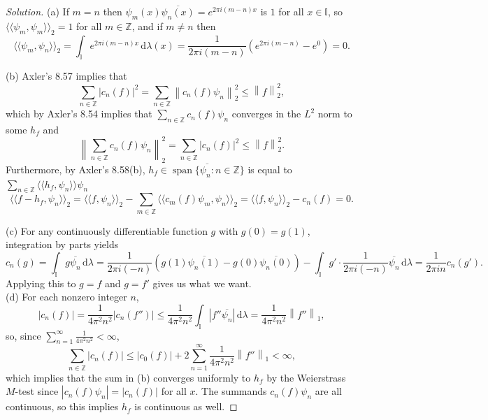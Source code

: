 \documentclass[10pt]{article}
\providecommand{\ol}{\overline}
\newcommand{\dd}{\,\mathrm{d}}
\providecommand{\II}{\mathbb I}
\providecommand{\ZZ}{\mathbb Z}
\newenvironment{soln}{\begin{proof}[Solution]}{\end{proof}}
\providecommand{\abs}[1]{\left\lvert #1\right\rvert}
\providecommand{\innerprod}[1]{\langle\!\langle #1\rangle\!\rangle}
\providecommand{\norm}[1]{\left\| #1\right\|}
\begin{document}
\begin{soln}
    (a) If $m=n$ then $\psi_m(x)\ol{\psi_n(x)} = e^{2\pi i(m-n)x}$
    is $1$ for all $x\in\II$, so $\innerprod{\psi_m,\psi_m}_2 = 1$
    for all $m\in\ZZ$, and if $m\ne n$ then
    \begin{equation*}
	\innerprod{\psi_m, \psi_n}_2 =
	\int_{\II} e^{2\pi i(m-n)x}\dd\lambda(x)
	= \frac{1}{2\pi i(m-n)}(e^{2\pi i(m-n)} - e^0) = 0.
    \end{equation*}

    (b) Axler's 8.57 implies that
    \[
	\sum_{n\in\ZZ} \abs{c_n(f)}^2 =
	\sum_{n\in\ZZ}\norm{c_n(f)\psi_n}_2^2 \le \norm{f}_2^2,
    \]
    which by Axler's 8.54 implies that $\sum_{n\in\ZZ}c_n(f)\psi_n$ converges
    in the $L^2$ norm to some $h_f$ and
    \begin{equation*}
	\norm{\sum_{n\in\ZZ} c_n(f)\psi_n}_2^2
	= \sum_{n\in\ZZ} \abs{c_n(f)}^2 \le \norm{f}_2^2.
    \end{equation*}
    Furthermore, by Axler's 8.58(b),
    $h_f\in\ol{\operatorname{span}\{\psi_n : n\in\ZZ\}}$
    is equal to $\sum_{n\in\ZZ}\innerprod{h_f,\psi_n}\psi_n$
    \begin{equation*}
	\innerprod{f-h_f,\psi_n}_2 = \innerprod{f,\psi_n}_2 -
	\sum_{m\in\ZZ}\innerprod{c_m(f)\psi_m,\psi_n}_2
	= \innerprod{f,\psi_n}_2 - c_n(f) = 0.
    \end{equation*}

    (c) For any continuously differentiable function $g$
    with $g(0) = g(1)$, integration by parts yields
    \begin{equation*}
	c_n(g) = \int_{\II} g\ol{\psi_n}\dd\lambda
	= \frac 1{2\pi i(-n)}(g(1)\ol{\psi_n(1)} - g(0)\ol{\psi_n(0)})
	- \int_{\II}g'\cdot\frac 1{2\pi i(-n)}\ol{\psi_n}\dd\lambda
	= \frac 1{2\pi in}c_n(g').
    \end{equation*}
    Applying this to $g = f$ and $g = f'$ gives us what we want.
    \\

    (d) For each nonzero integer $n$,
    \begin{equation*}
	\abs{c_n(f)} = \frac{1}{4\pi^2n^2}\abs{c_n(f'')}
	\le \frac 1{4\pi^2n^2}\int_{\II}\abs{f''\ol{\psi_n}}\dd\lambda
	= \frac 1{4\pi^2n^2}\norm{f''}_1,
    \end{equation*}
    so, since $\sum_{n=1}^\infty \frac1{4\pi^2n^2} < \infty$,
    \begin{equation*}
	\sum_{n\in\ZZ}\abs{c_n(f)} \le \abs{c_0(f)}
	+ 2\sum_{n=1}^\infty\frac 1{4\pi^2n^2}\norm{f''}_1
	< \infty,
    \end{equation*}
    which implies that the sum in (b) converges uniformly to $h_f$
    by the Weierstrass $M$-test
    since $\abs{c_n(f)\psi_n} = \abs{c_n(f)}$ for all $x$.
    The summands $c_n(f)\psi_n$ are all continuous,
    so this implies $h_f$ is continuous as well.
\end{soln}
\end{document}
